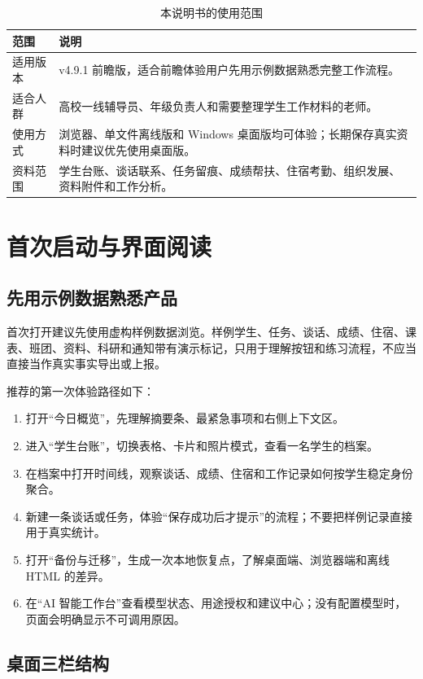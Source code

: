 \documentclass[UTF8,zihao=-4,oneside]{ctexrep}
\begin{document}
\begin{table}[H]
\centering
\caption{本说明书的使用范围}
\begin{tabularx}{\textwidth}{B{30mm} Y}
\toprule
范围 & 说明 \\
\midrule
适用版本 & v4.9.1 前瞻版，适合前瞻体验用户先用示例数据熟悉完整工作流程。 \\
适合人群 & 高校一线辅导员、年级负责人和需要整理学生工作材料的老师。 \\
使用方式 & 浏览器、单文件离线版和 Windows 桌面版均可体验；长期保存真实资料时建议优先使用桌面版。 \\
资料范围 & 学生台账、谈话联系、任务留痕、成绩帮扶、住宿考勤、组织发展、资料附件和工作分析。 \\
\bottomrule
\end{tabularx}
\end{table}

\chapter{首次启动与界面阅读}

\section{先用示例数据熟悉产品}

首次打开建议先使用虚构样例数据浏览。样例学生、任务、谈话、成绩、住宿、课表、班团、资料、科研和通知带有演示标记，只用于理解按钮和练习流程，不应当直接当作真实事实导出或上报。

推荐的第一次体验路径如下：

\begin{enumerate}
  \item 打开“今日概览”，先理解摘要条、最紧急事项和右侧上下文区。
  \item 进入“学生台账”，切换表格、卡片和照片模式，查看一名学生的档案。
  \item 在档案中打开时间线，观察谈话、成绩、住宿和工作记录如何按学生稳定身份聚合。
  \item 新建一条谈话或任务，体验“保存成功后才提示”的流程；不要把样例记录直接用于真实统计。
  \item 打开“备份与迁移”，生成一次本地恢复点，了解桌面端、浏览器端和离线 HTML 的差异。
  \item 在“AI 智能工作台”查看模型状态、用途授权和建议中心；没有配置模型时，页面会明确显示不可调用原因。
\end{enumerate}

\section{桌面三栏结构}
\end{document}
